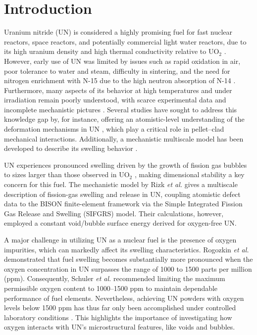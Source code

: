 \documentclass[preprint,12pt,sort&compress]{elsarticle}
\newcommand{\?}{\stackrel{?}{=}}
\begin{document}
\newpage

\linenumbers

\section{Introduction}
\label{intro}

Uranium nitride (UN) is considered a highly promising fuel for fast nuclear reactors, space reactors, and potentially commercial light water reactors, due to its high uranium density and high thermal conductivity relative to UO$_2$ \cite{Wallenius2020, Uno2020}. However, early use of UN was limited by issues such as rapid oxidation in air, poor tolerance to water and steam, difficulty in sintering, and the need for nitrogen enrichment with N-15 due to the high neutron absorption of N-14 \cite{Wallenius2020, Uno2020}. Furthermore, many aspects of its behavior at high temperatures and under irradiation remain poorly understood, with scarce experimental data and incomplete mechanistic pictures \cite{Wallenius2020, Uno2020}. Several studies have sought to address this knowledge gap by, for instance, offering an atomistic-level understanding of the deformation mechanisms in UN \cite{AbdulHameed2024b, AbdulHameed2024c}, which play a critical role in pellet–clad mechanical interactions. Additionally, a mechanistic multiscale model has been developed to describe its swelling behavior \cite{Rizk2025}.

UN experiences pronounced swelling driven by the growth of fission gas bubbles to sizes larger than those observed in UO$_2$ \cite{Ronchi1975, Ronchi1978, Rizk2025}, making dimensional stability a key concern for this fuel. The mechanistic model by Rizk \textit{et al.} \cite{Rizk2025} gives a multiscale description of fission-gas swelling and release in UN, coupling atomistic defect data to the BISON finite-element framework via the Simple Integrated Fission Gas Release and Swelling (SIFGRS) model. Their calculations, however, employed a constant void/bubble surface energy derived for oxygen-free UN.

A major challenge in utilizing UN as a nuclear fuel is the presence of oxygen impurities, which can markedly affect its swelling characteristics. Rogozkin \textit{et al.} \cite{Rogozkin2003} demonstrated that fuel swelling becomes substantially more pronounced when the oxygen concentration in UN surpasses the range of 1000 to 1500 parts per million (ppm). Consequently, Schuler \textit{et al.} \cite{Schuler2017} recommended limiting the maximum permissible oxygen content to 1000--1500 ppm to maintain dependable performance of fuel elements. Nevertheless, achieving UN powders with oxygen levels below 1500 ppm has thus far only been accomplished under controlled laboratory conditions \cite{Schuler2017}. This highlights the importance of investigating how oxygen interacts with UN's microstructural features, like voids and bubbles. 
\end{document}
